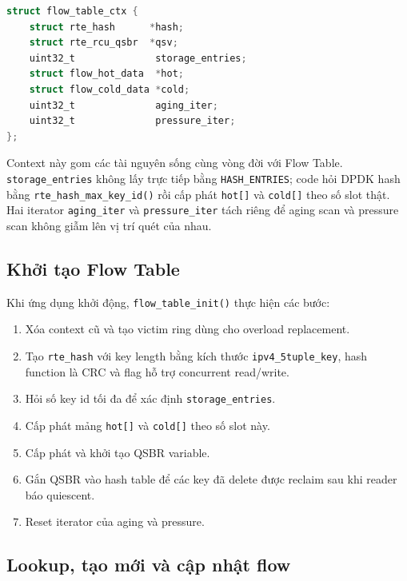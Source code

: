 \documentclass[12pt,a4paper]{report}
\DeclareRobustCommand{\code}[1]{{\small\texttt{#1}}}
\begin{document}
\begin{lstlisting}[language=C, caption={Context quản lý Flow Table}]
struct flow_table_ctx {
    struct rte_hash      *hash;
    struct rte_rcu_qsbr  *qsv;
    uint32_t              storage_entries;
    struct flow_hot_data  *hot;
    struct flow_cold_data *cold;
    uint32_t              aging_iter;
    uint32_t              pressure_iter;
};
\end{lstlisting}

Context này gom các tài nguyên sống cùng vòng đời với Flow Table. \code{storage\_entries} không lấy trực tiếp bằng \code{HASH\_ENTRIES}; code hỏi DPDK hash bằng \code{rte\_hash\_max\_key\_id()} rồi cấp phát \code{hot[]} và \code{cold[]} theo số slot thật. Hai iterator \code{aging\_iter} và \code{pressure\_iter} tách riêng để aging scan và pressure scan không giẫm lên vị trí quét của nhau.

\subsection{Khởi tạo Flow Table}

Khi ứng dụng khởi động, \code{flow\_table\_init()} thực hiện các bước:

\begin{enumerate}
    \item Xóa context cũ và tạo victim ring dùng cho overload replacement.
    \item Tạo \code{rte\_hash} với key length bằng kích thước \code{ipv4\_5tuple\_key}, hash function là CRC và flag hỗ trợ concurrent read/write.
    \item Hỏi số key id tối đa để xác định \code{storage\_entries}.
    \item Cấp phát mảng \code{hot[]} và \code{cold[]} theo số slot này.
    \item Cấp phát và khởi tạo QSBR variable.
    \item Gắn QSBR vào hash table để các key đã delete được reclaim sau khi reader báo quiescent.
    \item Reset iterator của aging và pressure.
\end{enumerate}

\subsection{Lookup, tạo mới và cập nhật flow}
\end{document}
